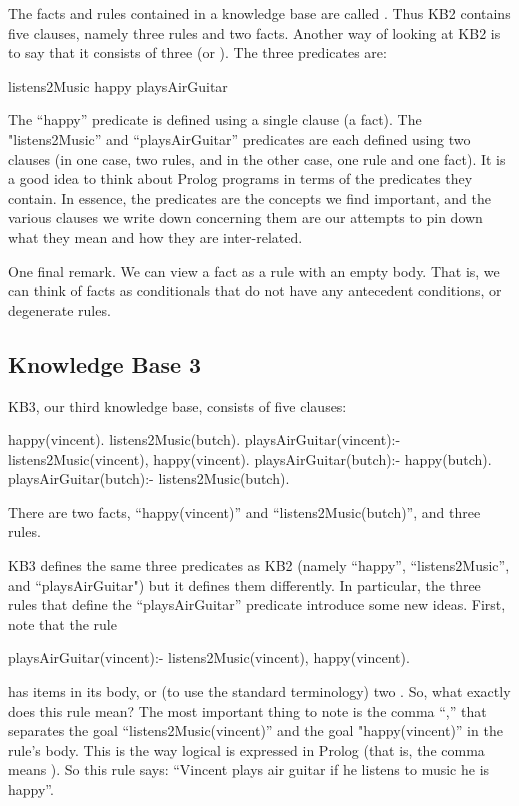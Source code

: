 The facts and rules contained in a knowledge base are called
.  Thus KB2 contains five clauses, namely three rules
and two facts. Another way of looking at KB2 is to say that it
consists of three  (or ). The
three predicates are:
\begin{LPNcodedisplay}
listens2Music
happy
playsAirGuitar
\end{LPNcodedisplay}
The ``happy'' predicate is defined using a single clause (a fact). The
"listens2Music'' and ``playsAirGuitar'' predicates are each defined using
two clauses (in one case, two rules, and in the other case, one rule
and one fact).  It is a good idea to think about Prolog programs in
terms of the predicates they contain.  In essence, the predicates are
the concepts we find important, and the various clauses we write down
concerning them are our attempts to pin down what they mean and how
they are inter-related.

One final remark. We can view a fact as a rule with an empty body.
That is, we can think of facts as conditionals that do not have any
antecedent conditions, or degenerate rules.



\subsection*{Knowledge Base 3}\label{SUBSEC.L1.KB3}



KB3, our third knowledge base, consists of five clauses:

\begin{LPNcodedisplay}
happy(vincent).
listens2Music(butch).
playsAirGuitar(vincent):-
   listens2Music(vincent),
   happy(vincent).
playsAirGuitar(butch):-
   happy(butch).
playsAirGuitar(butch):-
   listens2Music(butch).
\end{LPNcodedisplay}
There are two facts,  ``happy(vincent)'' and ``listens2Music(butch)'', and three rules.


KB3 defines the same three predicates as KB2 (namely ``happy'',
``listens2Music'', and ``playsAirGuitar") but it defines them
differently.  In particular, the three rules that define the
``playsAirGuitar'' predicate introduce some new ideas. First, note that
the rule
\begin{LPNcodedisplay}
playsAirGuitar(vincent):-
   listens2Music(vincent),
   happy(vincent).
\end{LPNcodedisplay}
has  items in its body, or (to use the standard
terminology) two .  So, what exactly does this rule
mean?  The most important thing to note is the comma ``,'' that
separates the goal ``listens2Music(vincent)'' and the goal
"happy(vincent)'' in the rule's body.  This is the way logical
 is expressed in Prolog (that is, the comma means
).  So this rule says: ``Vincent plays air guitar if he
listens to music  he is happy''.

